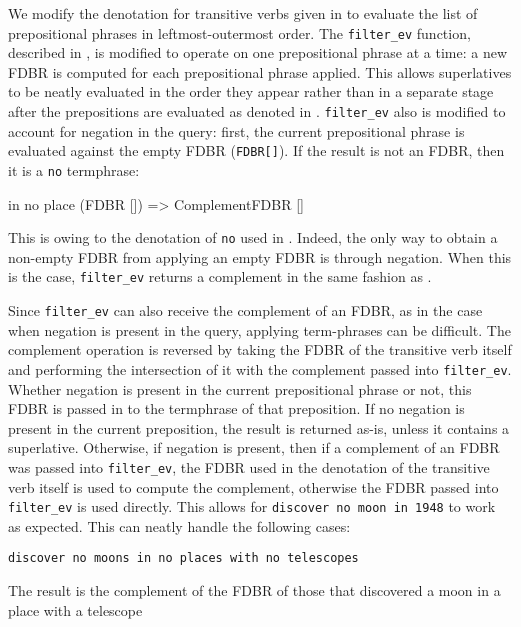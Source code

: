 \documentclass[../main.tex]{subfiles}
\begin{document}
\begin{refsection}
We modify the denotation for transitive verbs given in \cite{peelar2020webistjournal} to evaluate the list of prepositional phrases in leftmost-outermost order.  The \texttt{filter\_ev} function, described in \cite{peelar2016accommodating}, is modified to operate on one prepositional phrase at a time: a new FDBR is computed for each prepositional phrase applied.  This allows superlatives to be neatly evaluated in the order they appear rather than in a separate stage after the prepositions are evaluated as denoted in \cite{frostpeelar2019}.  \texttt{filter\_ev} also is modified to account for negation in the query: first, the current prepositional phrase is evaluated against the empty FDBR (\texttt{FDBR[]}).  If the result is not an FDBR, then it is a \texttt{no} termphrase:
\begin{code}
    in no place (FDBR []) => ComplementFDBR []
\end{code}
This is owing to the denotation of \texttt{no} used in .  Indeed, the only way to obtain a non-empty FDBR from applying an empty FDBR is through negation.  When this is the case, \texttt{filter\_ev} returns a complement in the same fashion as \cite{frostboulos2002}.

Since \texttt{filter\_ev} can also receive the complement of an FDBR, as in the case when negation is present in the query, applying term-phrases can be difficult.  The complement operation is reversed by taking the FDBR of the transitive verb itself and performing the intersection of it with the complement passed into \texttt{filter\_ev}.  Whether negation is present in the current prepositional phrase or not, this FDBR is passed in to the termphrase of that preposition.  If no negation is present in the current preposition, the result is returned as-is, unless it contains a superlative.  Otherwise, if negation is present, then if a complement of an FDBR was passed into \texttt{filter\_ev}, the FDBR used in the denotation of the transitive verb itself is used to compute the complement, otherwise the FDBR passed into \texttt{filter\_ev} is used directly. This allows for \texttt{discover no moon in 1948} to work as expected. This can neatly handle the following cases:

\examplespacing

\texttt{discover no moons in no places with no telescopes}

\examplespacing

\noindent The result is the complement of the FDBR of those that discovered a moon in a place with a telescope


\end{refsection}
\end{document}
